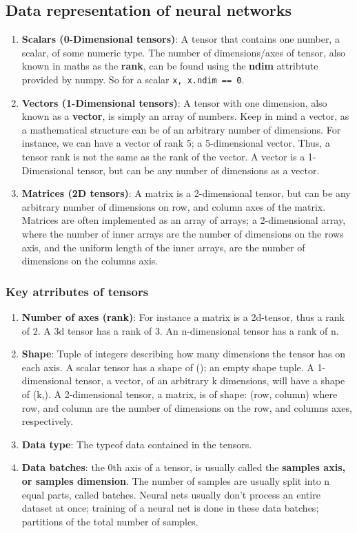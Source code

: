 \documentclass[12pt, a4paper]{article}
\begin{document}
\subsection{Data representation of neural networks}
\begin{enumerate}
   \item \textbf{Scalars (0-Dimensional tensors)}: A tensor that contains one number,
   a scalar, of some numeric type. The number of dimensions/axes of tensor, also known in maths
   as the \textbf{rank}, can be found using the \textbf{ndim} attribtute provided by numpy.
   So for a scalar  \lstinline{x, x.ndim == 0}.
   \item \textbf{Vectors (1-Dimensional tensors)}: A tensor with one dimension, also known as a \textbf{vector},
   is simply an array of numbers. Keep in mind a vector, as a mathematical structure can be of an arbitrary
   number of dimensions. For instance, we can have a vector of rank 5; a 5-dimensional vector. Thus,
   a tensor rank is not the same as the rank of the vector. A vector is a 1-Dimensional tensor, but can be any number of dimensions
   as a vector.
   \item \textbf{Matrices (2D tensors)}: A matrix is a 2-dimensional tensor,
   but can be any arbitrary number of dimensions on row, and column axes of the matrix.
   Matrices are often implemented as an array of arrays; a 2-dimensional array, where
   the number of inner arrays are the number of dimensions on the rows axis, and the uniform length of the inner arrays,
   are the number of dimensions on the columns axis.
\end{enumerate}

\subsubsection{Key atrributes of tensors}
\begin{enumerate}
   \item \textbf{Number of axes (rank)}: For instance a matrix is a 2d-tensor, thus a rank of 2.
   A 3d tensor has a rank of 3. An n-dimensional tensor has a rank of n.
   \item \textbf{Shape}: Tuple of integers describing how many dimensions the tensor has
   on each axis. A scalar tensor has a shape of (); an empty shape tuple. A
   1-dimensional tensor, a vector, of an arbitrary k dimensions, will have a shape of (k,).
   A 2-dimensional tensor, a matrix, is of shape: (row, column) where row, and column are the
   number of dimensions on the row, and columns axes, respectively.
   \item \textbf{Data type}: The typeof data contained in the tensors.
   \item \textbf{Data batches}: the 0th axis of a tensor, is usually called the 
   \textbf{samples axis, or samples dimension}. The number of samples are usually split into 
   n equal parts, called batches. Neural nets usually don't process an entire dataset at once; training of a neural net 
   is done in these data batches; partitions of the total number of samples.
\end{enumerate}
\end{document}
